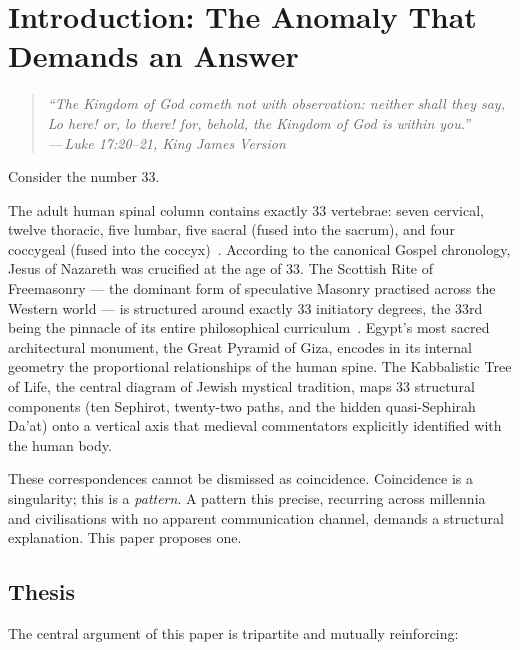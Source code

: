 \documentclass[12pt, a4paper]{article}
\newcommand{\epigraph}[2]{%
  \begin{quote}
    \itshape ``#1''\\[0.3em]
    \normalfont\small\hfill ---\,#2
  \end{quote}
}
\begin{document}
\section{Introduction: The Anomaly That Demands an Answer}

\epigraph{The Kingdom of God cometh not with observation: neither shall they
say, Lo here! or, lo there! for, behold, the Kingdom of God is within
you.}{Luke 17:20--21, King James Version}

Consider the number 33.

The adult human spinal column contains exactly 33 vertebrae: seven cervical,
twelve thoracic, five lumbar, five sacral (fused into the sacrum), and four
coccygeal (fused into the coccyx)~\autocite[97]{gray2016}. According to the
canonical Gospel chronology, Jesus of Nazareth was crucified at the age of
33. The Scottish Rite of Freemasonry — the dominant form of speculative
Masonry practised across the Western world — is structured around exactly 33
initiatory degrees, the 33rd being the pinnacle of its entire philosophical
curriculum~\autocite[860]{mackey1874}. Egypt's most sacred architectural
monument, the Great Pyramid of Giza, encodes in its internal geometry the
proportional relationships of the human spine. The Kabbalistic Tree of Life,
the central diagram of Jewish mystical tradition, maps 33 structural
components (ten Sephirot, twenty-two paths, and the hidden quasi-Sephirah
Da'at) onto a vertical axis that medieval commentators explicitly identified
with the human body.

These correspondences cannot be dismissed as coincidence. Coincidence is a
singularity; this is a \emph{pattern}. A pattern this precise, recurring
across millennia and civilisations with no apparent communication channel,
demands a structural explanation. This paper proposes one.

\subsection{Thesis}

The central argument of this paper is tripartite and mutually reinforcing:
\end{document}
